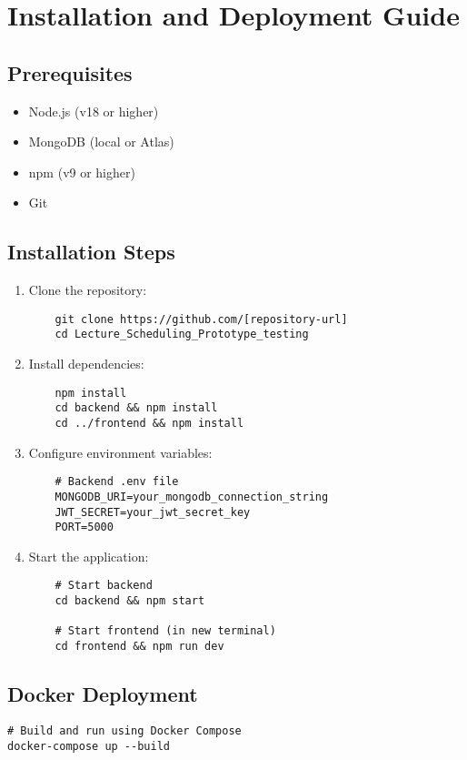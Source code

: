 \chapter{Installation and Deployment Guide}

\section{Prerequisites}
\begin{itemize}[leftmargin=*]
    \item Node.js (v18 or higher)
    \item MongoDB (local or Atlas)
    \item npm (v9 or higher)
    \item Git
\end{itemize}

\section{Installation Steps}
\begin{enumerate}
    \item Clone the repository:
    \begin{verbatim}
    git clone https://github.com/[repository-url]
    cd Lecture_Scheduling_Prototype_testing
    \end{verbatim}
    
    \item Install dependencies:
    \begin{verbatim}
    npm install
    cd backend && npm install
    cd ../frontend && npm install
    \end{verbatim}
    
    \item Configure environment variables:
    \begin{verbatim}
    # Backend .env file
    MONGODB_URI=your_mongodb_connection_string
    JWT_SECRET=your_jwt_secret_key
    PORT=5000
    \end{verbatim}
    
    \item Start the application:
    \begin{verbatim}
    # Start backend
    cd backend && npm start
    
    # Start frontend (in new terminal)
    cd frontend && npm run dev
    \end{verbatim}
\end{enumerate}

\section{Docker Deployment}
\begin{verbatim}
# Build and run using Docker Compose
docker-compose up --build
\end{verbatim}
